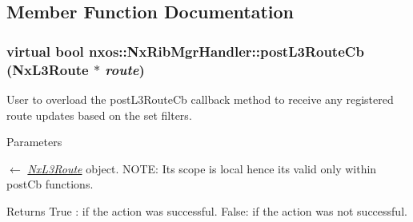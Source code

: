 \subsection{Member Function Documentation}
\hypertarget{classnxos_1_1NxRibMgrHandler_a1b742d50365fdece0ea47eb38300f7de}{
\subsubsection[{postL3RouteCb}]{\setlength{\rightskip}{0pt plus 5cm}virtual bool nxos::NxRibMgrHandler::postL3RouteCb ({\bf NxL3Route} $\ast$ {\em route})}}
\label{classnxos_1_1NxRibMgrHandler_a1b742d50365fdece0ea47eb38300f7de}
User to overload the postL3RouteCb callback method to receive any registered route updates based on the set filters. 
\begin{DoxyParams}{Parameters}
\item[\mbox{$\leftarrow$} {\em \hyperlink{classnxos_1_1NxL3Route}{NxL3Route}}]object. NOTE: Its scope is local hence its valid only within postCb functions.\end{DoxyParams}
\begin{DoxyReturn}{Returns}
True : if the action was successful. False: if the action was not successful.
\end{DoxyReturn}

